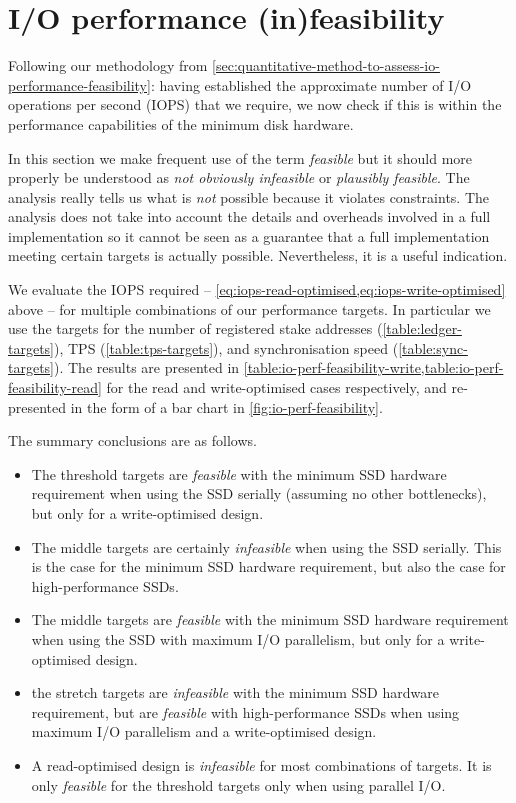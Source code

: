 \documentclass[11pt,a4paper]{article}
\begin{document}
\section{I/O performance (in)feasibility}
\label{sec:io-performance-infeasibility}

Following our methodology from
\cref{sec:quantitative-method-to-assess-io-performance-feasibility}: having
established the approximate number of I/O operations per second (IOPS) that we
require, we now check if this is within the performance capabilities of the
minimum disk hardware.

In this section we make frequent use of the term \emph{feasible} but it should
more properly be understood as \emph{not obviously infeasible} or
\emph{plausibly feasible}. The analysis really tells us what is \emph{not}
possible because it violates constraints. The analysis does not take into
account the details and overheads involved in a full implementation so it
cannot be seen as a guarantee that a full implementation meeting certain
targets is actually possible. Nevertheless, it is a useful indication.

We evaluate the IOPS required -- \cref{eq:iops-read-optimised,eq:iops-write-optimised} above -- for multiple combinations of our performance targets.
In particular we use the targets for the number of registered stake addresses (\cref{table:ledger-targets}), TPS (\cref{table:tps-targets}), and
synchronisation speed (\cref{table:sync-targets}). The results are presented in
\cref{table:io-perf-feasibility-write,table:io-perf-feasibility-read} for the
read and write-optimised cases respectively, and re-presented in the form of a
bar chart in \cref{fig:io-perf-feasibility}.

The summary conclusions are as follows.
\begin{itemize}
\item The threshold targets are \emph{feasible} with the minimum SSD hardware
      requirement when using the SSD serially (assuming no other bottlenecks),
      but only for a write-optimised design.
\item The middle targets are certainly \emph{infeasible} when using the SSD
      serially. This is the case for the minimum SSD hardware requirement, but
      also the case for high-performance SSDs.
\item The middle targets are \emph{feasible} with the minimum SSD hardware
      requirement when using the SSD with maximum I/O parallelism, but only for
      a write-optimised design.
\item the stretch targets are \emph{infeasible} with the minimum SSD hardware
      requirement, but are \emph{feasible} with high-performance SSDs when using
      maximum I/O parallelism and a write-optimised design.
\item A read-optimised design is \emph{infeasible} for most combinations of
      targets. It is only \emph{feasible} for the threshold targets only when using parallel I/O.
\end{itemize}
\end{document}
